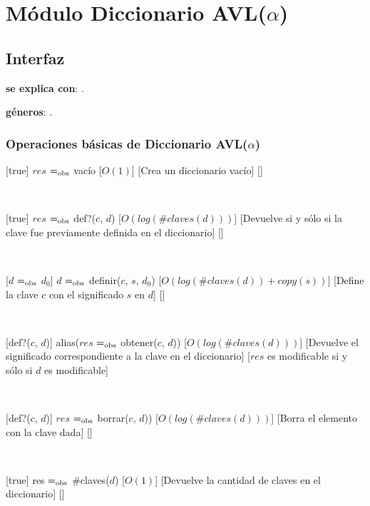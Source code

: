 \section{Módulo Diccionario AVL($\alpha$)}

\subsection{Interfaz}

\textbf{se explica con}: .

\textbf{géneros}: .

\subsubsection{Operaciones básicas de Diccionario AVL($\alpha$)}

	[true]
	{$res$ $=_{\mathrm{obs}}$ vacío}%
	[$O(1)$]
	[Crea un diccionario vacío]
	[]

	~

	[true]
	{$res$ $=_{\mathrm{obs}}$ def?($c$, $d$)}
	[$O(log(\#claves(d)))$]
	[Devuelve  si y sólo si la clave fue previamente definida en el diccionario]
	[]

	~

	[$d$ $=_{\mathrm{obs}}$ $d_0$]
	{$d$ $=_{\mathrm{obs}}$ definir($c$, $s$, $d_0$)}
	[$O(log(\#claves(d)) + copy(s))$]
	[Define la clave $c$ con el significado $s$ en $d$]
	[]

	~

	[def?($c$, $d$)]
	{alias($res$ $=_{\mathrm{obs}}$ obtener($c$, $d$))}
	[$O(log(\#claves(d)))$]
	[Devuelve el significado correspondiente a la clave en el diccionario]
	[$res$ es modificable si y sólo si $d$ es modificable]

	~

	[def?($c$, $d$)]
	{$res$ $=_{\mathrm{obs}}$ borrar($c$, $d$))}
	[$O(log(\#claves(d)))$]
	[Borra el elemento con la clave dada]
	[]

	~

	[true]
	{res $=_{\mathrm{obs}}$ $\#$claves($d$)}
	[$O(1)$]
	[Devuelve la cantidad de claves en el diccionario]
	[]
	
